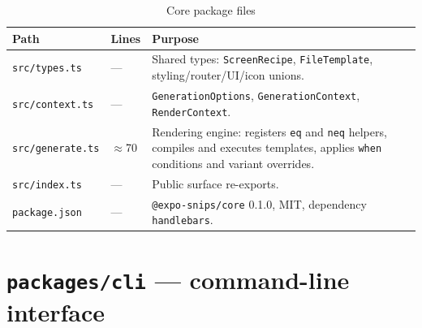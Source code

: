 \begin{longtable}{p{5cm}p{2.2cm}p{7.2cm}}
\caption{Core package files}\\
\toprule
\textbf{Path} & \textbf{Lines} & \textbf{Purpose} \\
\midrule

\texttt{src/types.ts} & --- & Shared types: \texttt{ScreenRecipe},
\texttt{FileTemplate}, styling/router/UI/icon unions. \\
\texttt{src/context.ts} & --- & \texttt{GenerationOptions},
\texttt{GenerationContext}, \texttt{RenderContext}. \\
\texttt{src/generate.ts} & $\approx$70 & Rendering engine: registers \texttt{eq} and
\texttt{neq} helpers, compiles and executes templates, applies \texttt{when}
conditions and variant overrides. \\
\texttt{src/index.ts} & --- & Public surface re-exports. \\
\texttt{package.json} & --- & \texttt{@expo-snips/core} 0.1.0, MIT, dependency
\texttt{handlebars}. \\
\bottomrule
\end{longtable}

\section{\texttt{packages/cli} --- command-line interface}

